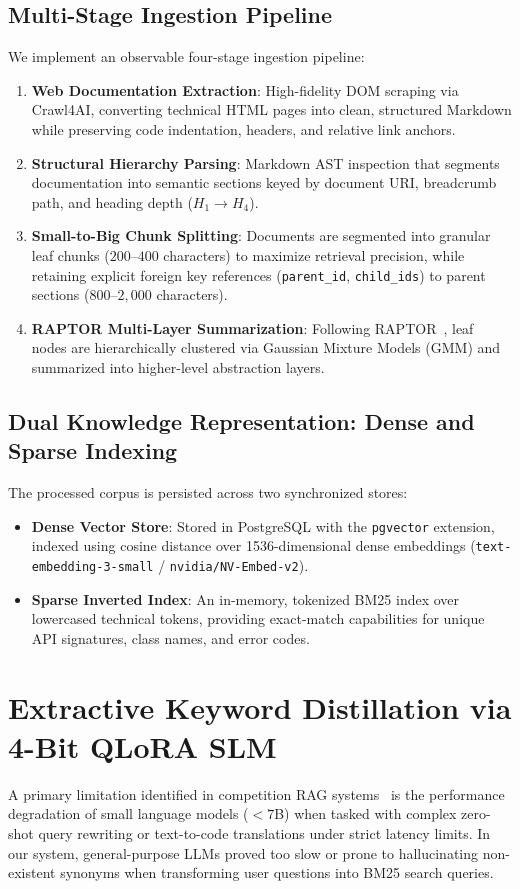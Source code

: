 \documentclass[sigconf,nonacm]{acmart}
\begin{document}
\subsection{Multi-Stage Ingestion Pipeline}
We implement an observable four-stage ingestion pipeline:
\begin{enumerate}
    \item \textbf{Web Documentation Extraction}: High-fidelity DOM scraping via Crawl4AI, converting technical HTML pages into clean, structured Markdown while preserving code indentation, headers, and relative link anchors.
    \item \textbf{Structural Hierarchy Parsing}: Markdown AST inspection that segments documentation into semantic sections keyed by document URI, breadcrumb path, and heading depth ($H_1 \to H_4$).
    \item \textbf{Small-to-Big Chunk Splitting}: Documents are segmented into granular leaf chunks ($200\text{--}400$ characters) to maximize retrieval precision, while retaining explicit foreign key references (\texttt{parent\_id}, \texttt{child\_ids}) to parent sections ($800\text{--}2,000$ characters).
    \item \textbf{RAPTOR Multi-Layer Summarization}: Following RAPTOR~\cite{raptor}, leaf nodes are hierarchically clustered via Gaussian Mixture Models (GMM) and summarized into higher-level abstraction layers.
\end{enumerate}

\subsection{Dual Knowledge Representation: Dense and Sparse Indexing}
The processed corpus is persisted across two synchronized stores:
\begin{itemize}
    \item \textbf{Dense Vector Store}: Stored in PostgreSQL with the \texttt{pgvector} extension, indexed using cosine distance over 1536-dimensional dense embeddings (\texttt{text-embedding-3-small} / \texttt{nvidia/NV-Embed-v2}).
    \item \textbf{Sparse Inverted Index}: An in-memory, tokenized BM25 index over lowercased technical tokens, providing exact-match capabilities for unique API signatures, class names, and error codes.
\end{itemize}

\section{Extractive Keyword Distillation via 4-Bit QLoRA SLM}
A primary limitation identified in competition RAG systems~\cite{kdd_winning} is the performance degradation of small language models ($<7$B) when tasked with complex zero-shot query rewriting or text-to-code translations under strict latency limits. In our system, general-purpose LLMs proved too slow or prone to hallucinating non-existent synonyms when transforming user questions into BM25 search queries.
\end{document}
